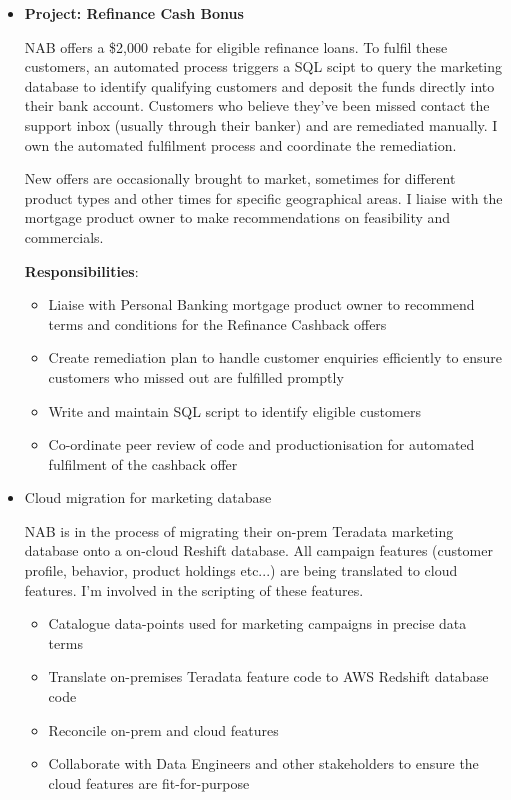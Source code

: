 \documentclass{article}
\begin{document}
\begin{itemize}
    \item \textbf{Project: Refinance Cash Bonus}

        NAB offers a \$2,000 rebate for eligible refinance loans. To fulfil these customers, an automated process triggers a SQL scipt to query the marketing database to identify qualifying customers and deposit the funds directly into their bank account. Customers who believe they've been missed contact the support inbox (usually through their banker) and are remediated manually. I own the automated fulfilment process and coordinate the remediation.

        New offers are occasionally brought to market, sometimes for different product types and other times for specific geographical areas. I liaise with the mortgage product owner to make recommendations on feasibility and commercials.

        \textbf{Responsibilities}:

        \begin{itemize}
            \item Liaise with Personal Banking mortgage product owner to recommend terms and conditions for the Refinance Cashback offers
            \item Create remediation plan to handle customer enquiries efficiently to ensure customers who missed out are fulfilled promptly
            \item Write and maintain SQL script to identify eligible customers
            \item Co-ordinate peer review of code and productionisation for automated fulfilment of the cashback offer
        \end{itemize}
    \item Cloud migration for marketing database

        NAB is in the process of migrating their on-prem Teradata marketing database onto a on-cloud Reshift database. All campaign features (customer profile, behavior, product holdings etc...) are being translated to cloud features. I'm involved in the scripting of these features.

        \begin{itemize}
            \item Catalogue data-points used for marketing campaigns in precise data terms
            \item Translate on-premises Teradata feature code to AWS Redshift database code
            \item Reconcile on-prem and cloud features
            \item Collaborate with Data Engineers and other stakeholders to ensure the cloud features are fit-for-purpose
        \end{itemize}
\end{itemize}
\end{document}
